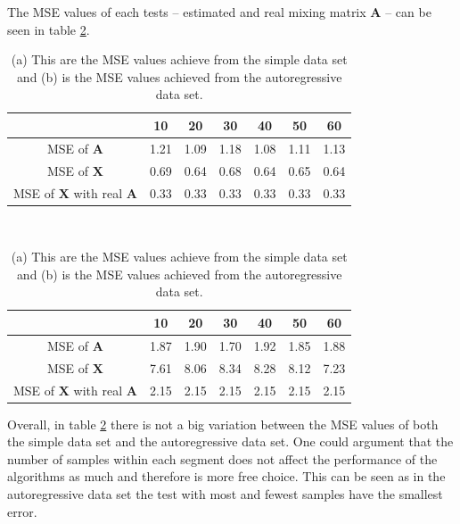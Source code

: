 \noindent
The MSE values of each tests -- estimated and real mixing matrix $\mathbf{A}$ -- can be seen in table \ref{tab:seg}.
\begin{table}[H]
\centering
\begin{minipage}{.45\textwidth}
\centering
\begin{tabular}{|c|c|c|c|c|c|c|}
\hline 
 & 10 & 20 & 30 & 40 & 50 & 60 \\ 
\hline 
MSE of $\mathbf{A}$ & 1.21 & 1.09 & 1.18 & 1.08 & 1.11 & 1.13 \\ 
\hline 
MSE of $\mathbf{X}$ & 0.69 & 0.64 & 0.68 & 0.64 & 0.65 & 0.64 \\ 
\hline 
MSE of $\mathbf{X}$ with real $\mathbf{A}$ & 0.33 & 0.33 & 0.33 & 0.33 & 0.33 & 0.33 \\ 
\hline
\end{tabular} 
\end{minipage}
\\
\begin{minipage}{.45\textwidth}
\centering
\begin{tabular}{|c|c|c|c|c|c|c|}
\hline 
 & 10 & 20 & 30 & 40 & 50 & 60 \\ 
\hline
MSE of $\mathbf{A}$ & 1.87 & 1.90 & 1.70 & 1.92 & 1.85 & 1.88 \\
\hline 
MSE of $\mathbf{X}$ & 7.61 & 8.06 & 8.34 & 8.28 & 8.12 & 7.23 \\ 
\hline
MSE of $\mathbf{X}$ with real $\mathbf{A}$ & 2.15 & 2.15 & 2.15 & 2.15 & 2.15 & 2.15 \\  
\hline
\end{tabular} 
\end{minipage}
\caption{(a) This are the MSE values achieve from the simple data set and (b) is the MSE values achieved from the autoregressive data set.}
\label{tab:seg}
\end{table}
\noindent
Overall, in table \ref{tab:seg} there is not a big variation between the MSE values of both the simple data set and the autoregressive data set. One could argument that the number of samples within each segment does not affect the performance of the algorithms as much and therefore is more free choice. This can be seen as in the autoregressive data set the test with most and fewest samples have the smallest error.